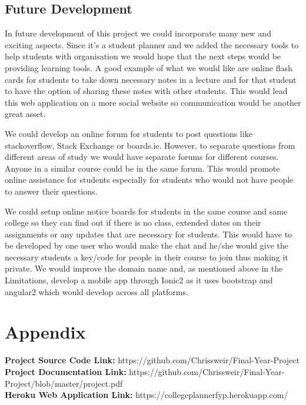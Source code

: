 \section{Future Development}
In future development of this project we could incorporate many new and exciting aspects. Since it’s a student planner and we added the necessary tools to help students with organisation we would hope that the next steps would be providing learning tools. A good example of what we would like are online flash cards for students to take down necessary notes in a lecture and for that student to have the option of sharing these notes with other students. This would lead this web application on a more social website so communication would be another great asset. \par
We could develop an online forum for students to post questions like stackoverflow, Stack Exchange or boards.ie. However, to separate questions from different areas of study we would have separate forums for different courses. Anyone in a similar course could be in the same forum. This would promote online assistance for students especially for students who would not have people to answer their questions. \par
We could setup online notice boards for students in the same course and same college so they can find out if there is no class, extended dates on their assignments or any updates that are necessary for students. This would have to be developed by one user who would make the chat and he/she would give the necessary students a key/code for people in their course to join thus making it private.
We would improve the domain name and, as mentioned above in the Limitations, develop a mobile app through Ionic2 as it uses bootstrap and angular2 which would develop across all platforms. 

\chapter{Appendix}
\textbf{Project Source Code Link: }https://github.com/Chrissweir/Final-Year-Project \\
\textbf{Project Documentation Link: }https://github.com/Chrissweir/Final-Year-Project/blob/master/project.pdf \\
\textbf{Heroku Web Application Link: }https://collegeplannerfyp.herokuapp.com/ \\
